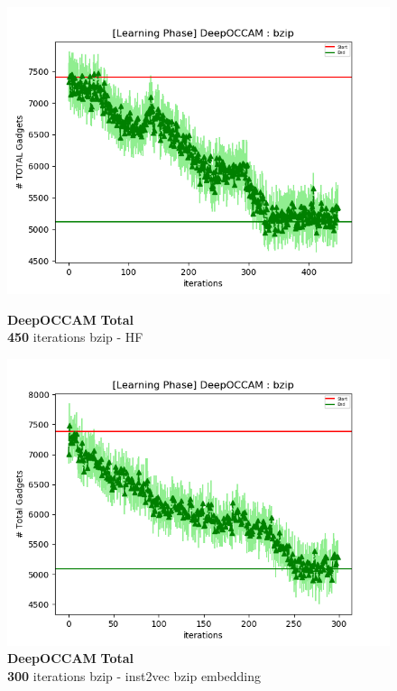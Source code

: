 \documentclass{relatorio}
\begin{document}
	\begin{figure}[H]
	\centering
	\captionsetup{justification=centering}
	\includegraphics[width=1\linewidth]{imgs/deepoccam_HF_learning_bzip_TOTAL_plot.png}
	\caption{\textbf{DeepOCCAM} \textbf{Total} \\ \textbf{450} iterations \color{blue} bzip - HF}%
	\label{fig:plant}
	\centering
	\captionsetup{justification=centering}
	\includegraphics[width=1\linewidth]{imgs/deepoccam_inst2vec_bzip_Total_plot.png}
	\caption{\textbf{DeepOCCAM} \textbf{Total} \\ \textbf{300} iterations \color{blue} bzip - inst2vec bzip embedding}%
	\label{fig:plant}
	\centering
	\captionsetup{justification=centering}

\end{figure}
\end{document}
